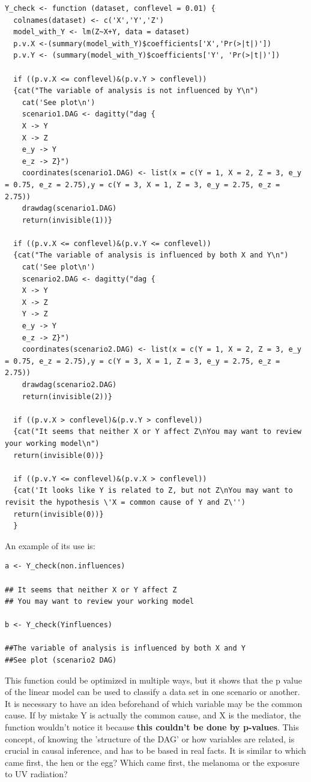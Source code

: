 \documentclass{article}
\begin{document}
\begin{lstlisting}
Y_check <- function (dataset, conflevel = 0.01) {
  colnames(dataset) <- c('X','Y','Z')
  model_with_Y <- lm(Z~X+Y, data = dataset)
  p.v.X <-(summary(model_with_Y)$coefficients['X','Pr(>|t|)'])
  p.v.Y <- (summary(model_with_Y)$coefficients['Y', 'Pr(>|t|)'])
  
  if ((p.v.X <= conflevel)&(p.v.Y > conflevel))
  {cat("The variable of analysis is not influenced by Y\n")
    cat('See plot\n')
    scenario1.DAG <- dagitty("dag {
    X -> Y
    X -> Z
    e_y -> Y
    e_z -> Z}")
    coordinates(scenario1.DAG) <- list(x = c(Y = 1, X = 2, Z = 3, e_y = 0.75, e_z = 2.75),y = c(Y = 3, X = 1, Z = 3, e_y = 2.75, e_z = 2.75))
    drawdag(scenario1.DAG)
    return(invisible(1))}
  
  if ((p.v.X <= conflevel)&(p.v.Y <= conflevel))
  {cat("The variable of analysis is influenced by both X and Y\n")
    cat('See plot\n')
    scenario2.DAG <- dagitty("dag {
    X -> Y
    X -> Z
    Y -> Z
    e_y -> Y
    e_z -> Z}")
    coordinates(scenario2.DAG) <- list(x = c(Y = 1, X = 2, Z = 3, e_y = 0.75, e_z = 2.75),y = c(Y = 3, X = 1, Z = 3, e_y = 2.75, e_z = 2.75))
    drawdag(scenario2.DAG)
    return(invisible(2))}

  if ((p.v.X > conflevel)&(p.v.Y > conflevel))
  {cat("It seems that neither X or Y affect Z\nYou may want to review your working model\n")
  return(invisible(0))}
  
  if ((p.v.Y <= conflevel)&(p.v.X > conflevel))
  {cat('It looks like Y is related to Z, but not Z\nYou may want to revisit the hypothesis \'X = common cause of Y and Z\'')
  return(invisible(0))}
  }
\end{lstlisting}

An example of its use is:

\begin{lstlisting}
a <- Y_check(non.influences)

## It seems that neither X or Y affect Z
## You may want to review your working model

b <- Y_check(Yinfluences)

##The variable of analysis is influenced by both X and Y
##See plot (scenario2 DAG)
\end{lstlisting}

This function could be optimized in multiple ways, but it shows that the p value of the linear model can be used to classify a data set in one scenario or another. It is necessary to have an idea beforehand of which variable may be the common cause. If by mistake Y is actually the common cause, and X is the mediator, the function wouldn't notice it because \textbf{this couldn't be done by p-values}. This concept, of knowing the 'structure of the DAG' or how variables are related, is crucial in causal inference, and has to be based in real facts. It is similar to which came first, the hen or the egg? Which came first, the melanoma or the exposure to UV radiation?
\end{document}
